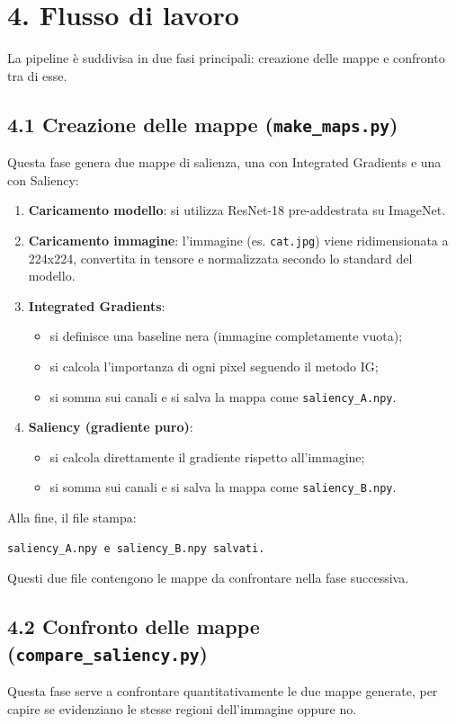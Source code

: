 \documentclass[a4paper,11pt]{article}
\begin{document}
\section*{4. Flusso di lavoro}
La pipeline è suddivisa in due fasi principali: creazione delle mappe e confronto tra di esse.

\subsection*{4.1 Creazione delle mappe (\texttt{make\_maps.py})}
Questa fase genera due mappe di salienza, una con Integrated Gradients e una con Saliency:

\begin{enumerate}
\item \textbf{Caricamento modello}: si utilizza ResNet-18 pre-addestrata su ImageNet.
\item \textbf{Caricamento immagine}: l'immagine (es. \texttt{cat.jpg}) viene ridimensionata a 224x224, convertita in tensore e normalizzata secondo lo standard del modello.
\item \textbf{Integrated Gradients}:
\begin{itemize}
\item si definisce una baseline nera (immagine completamente vuota);
\item si calcola l'importanza di ogni pixel seguendo il metodo IG;
\item si somma sui canali e si salva la mappa come \texttt{saliency\_A.npy}.
\end{itemize}
\item \textbf{Saliency (gradiente puro)}:
\begin{itemize}
\item si calcola direttamente il gradiente rispetto all'immagine;
\item si somma sui canali e si salva la mappa come \texttt{saliency\_B.npy}.
\end{itemize}
\end{enumerate}

Alla fine, il file stampa:
\begin{verbatim}
saliency_A.npy e saliency_B.npy salvati.
\end{verbatim}

Questi due file contengono le mappe da confrontare nella fase successiva.

\subsection*{4.2 Confronto delle mappe (\texttt{compare\_saliency.py})}
Questa fase serve a confrontare quantitativamente le due mappe generate, per capire se evidenziano le stesse regioni dell'immagine oppure no.
\end{document}
